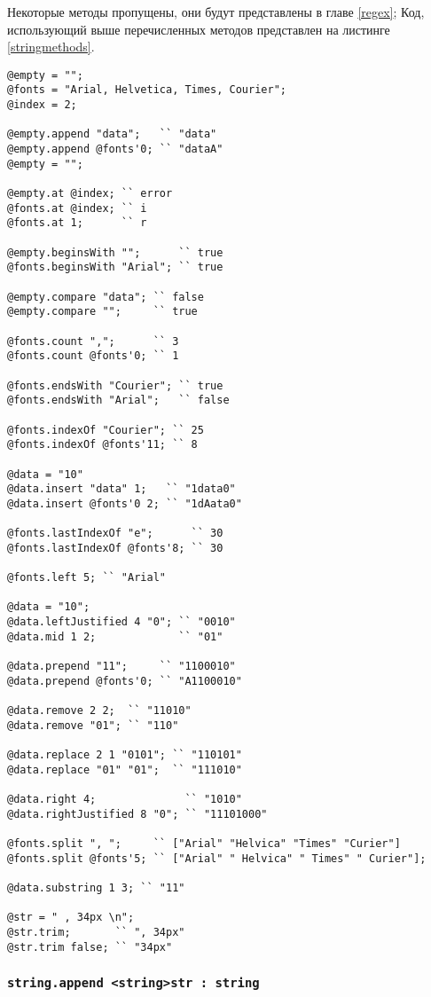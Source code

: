 \documentclass[a4paper, 14pt]{extarticle}
\begin{document}
Некоторые методы пропущены, они будут представлены в главе \ref{regex}; Код, использующий выше перечисленных методов представлен на листинге \ref{stringmethods}.

\begin{lstlisting}[caption=Методы класса string, label=stringmethods]
@empty = "";
@fonts = "Arial, Helvetica, Times, Courier";
@index = 2;

@empty.append "data";   `` "data"
@empty.append @fonts'0; `` "dataA"
@empty = "";

@empty.at @index; `` error
@fonts.at @index; `` i
@fonts.at 1;	  `` r

@empty.beginsWith "";      `` true
@fonts.beginsWith "Arial"; `` true

@empty.compare "data"; `` false
@empty.compare "";     `` true

@fonts.count ",";      `` 3
@fonts.count @fonts'0; `` 1

@fonts.endsWith "Courier"; `` true
@fonts.endsWith "Arial";   `` false

@fonts.indexOf "Courier"; `` 25
@fonts.indexOf @fonts'11; `` 8

@data = "10"
@data.insert "data" 1;   `` "1data0"
@data.insert @fonts'0 2; `` "1dAata0"

@fonts.lastIndexOf "e";      `` 30
@fonts.lastIndexOf @fonts'8; `` 30

@fonts.left 5; `` "Arial"

@data = "10";
@data.leftJustified 4 "0"; `` "0010"
@data.mid 1 2;             `` "01"

@data.prepend "11";     `` "1100010"
@data.prepend @fonts'0; `` "A1100010"

@data.remove 2 2;  `` "11010"
@data.remove "01"; `` "110"

@data.replace 2 1 "0101"; `` "110101"
@data.replace "01" "01";  `` "111010"

@data.right 4; 				`` "1010"
@data.rightJustified 8 "0"; `` "11101000"

@fonts.split ", ";     `` ["Arial" "Helvica" "Times" "Curier"]
@fonts.split @fonts'5; `` ["Arial" " Helvica" " Times" " Curier"];

@data.substring 1 3; `` "11"

@str = " , 34px \n";
@str.trim;       `` ", 34px"
@str.trim false; `` "34px"
\end{lstlisting}

\subsubsection{\lstinline|string.append <string>str : string|}
\end{document}
